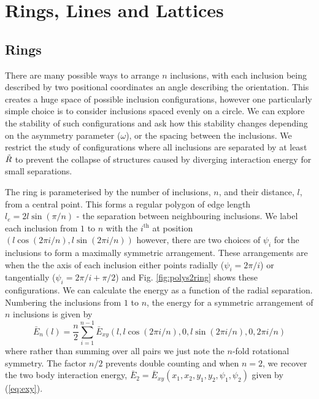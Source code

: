 \section{Rings, Lines and Lattices}

\subsection{Rings}

There are many possible ways to arrange $n$ inclusions, with each inclusion being described by two positional coordinates an angle describing the orientation. This creates a huge space of possible inclusion configurations, however one particularly simple choice is to consider inclusions spaced evenly on a circle. We can explore the stability of such configurations and ask how this stability changes depending on the asymmetry parameter ($\omega$), or the spacing between the inclusions. We restrict the study of configurations where all inclusions are separated by at least $\Tilde{R}$ to prevent the collapse of structures caused by diverging interaction energy for small separations.

The ring is parameterised by the number of inclusions, $n$, and their distance, $l$, from a central point. This forms a regular polygon of edge length $l_e = 2l\sin(\pi/n)$ - the separation between neighbouring inclusions. We label each inclusion from $1$ to $n$ with the $i^{\text{th}}$ at position $(l\cos(2\pi i/n),l\sin(2\pi i/n))$ however, there are two choices of $\psi_i$ for the inclusions to form a maximally symmetric arrangement. These arrangements are when the the axis of each inclusion either points radially ($\psi_i = 2\pi/i$) or tangentially ($\psi_i = 2\pi/i+\pi/2$) and Fig. \ref{fig:polys2ring} shows these configurations. We can calculate the energy as a function of the radial separation. Numbering the inclusions from $1$ to $n$, the energy for a symmetric arrangement of $n$ inclusions is given by
\begin{equation}
\bar{E}_{n}(l) = \frac{n}{2}\sum_{i=1}^{n-1} \bar{E}_{xy}(l,l\cos(2\pi i/n),0,l\sin(2\pi i/n),0,2\pi i/n)
\label{eq:ring_sum}
\end{equation}
where rather than summing over all pairs we just note the $n$-fold rotational symmetry. The factor $n/2$ prevents double counting and when $n=2$, we recover the two body interaction energy, $\bar{E}_2 = \bar{E}_{xy}\left(x_1,x_2,y_1,y_2,\psi_1,\psi_2\right)$ given by (\ref{eq:exy}).

